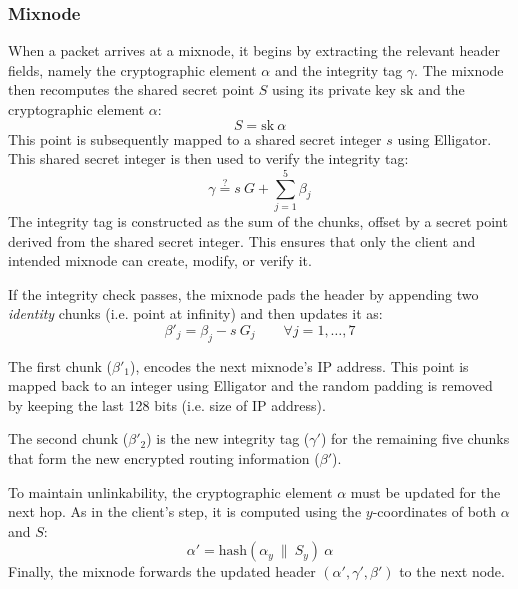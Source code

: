 \subsubsection{Mixnode}


When a packet arrives at a mixnode, it begins by extracting the relevant header fields, namely the cryptographic element $ \alpha $ and the integrity tag $ \gamma $.  
The mixnode then recomputes the shared secret point $ S $ using its private key $ \text{sk} $ and the cryptographic element $ \alpha $:  
\[
S = \text{sk} \ \alpha
\]
This point is subsequently mapped to a shared secret integer $ s $ using Elligator.
This shared secret integer is then used to verify the integrity tag: 
\[
\gamma \overset{\text{?}}{=} s \ G + \sum_{j=1}^{5} \beta_j
\]
The integrity tag is constructed as the sum of the chunks, offset by a secret point derived from the shared secret integer. 
This ensures that only the client and intended mixnode can create, modify, or verify it.

\noindent If the integrity check passes, the mixnode pads the header by appending two \textit{identity} chunks (i.e. point at infinity) and then updates it as:
\[
\beta'_j = \beta_j - s \ G_j \qquad \forall j = 1, \dots, 7
\]

The first chunk ($ \beta'_1 $), encodes the next mixnode’s IP address. 
This point is mapped back to an integer using Elligator and the random padding is removed by keeping the last 128 bits (i.e. size of IP address).

\noindent The second chunk ($ \beta'_2 $) is the new integrity tag ($ \gamma' $) for the remaining five chunks that form the new encrypted routing information ($ \beta' $).

To maintain unlinkability, the cryptographic element $ \alpha $ must be updated for the next hop. 
As in the client's step, it is computed using the $y$-coordinates of both $ \alpha $ and $ S $:
\[
\alpha' = \text{hash}(\alpha_y \ \| \ S_y) \ \alpha
\]
Finally, the mixnode forwards the updated header $ (\alpha', \gamma', \beta') $ to the next node.
